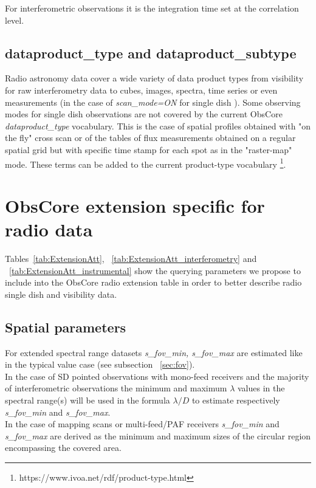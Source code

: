\documentclass[11pt,a4paper]{ivoa}
\begin{document}
For interferometric observations it is the integration time set at the correlation level.

\subsection{dataproduct\_type and dataproduct\_subtype}

Radio astronomy data cover a wide variety of data product types from visibility for raw interferometry data to cubes, images, spectra, time series
or even measurements (in the case of \emph{scan\_mode=ON}  for single dish ). 
Some observing modes for single dish observations are not covered by
the current ObsCore \emph{dataproduct\_type} vocabulary. 
This is the case of spatial profiles obtained with "on the fly" cross scan or of the
tables of flux measurements obtained on a regular spatial grid but with specific time stamp 
for each spot as in the "raster-map"  mode.
These terms can be added to the current product-type vocabulary \footnote{https://www.ivoa.net/rdf/product-type.html}.

\section{ObsCore extension specific for radio data}

Tables~\ref{tab:ExtensionAtt}, ~\ref{tab:ExtensionAtt_interferometry} and ~\ref{tab:ExtensionAtt_instrumental} show the
querying parameters we propose to include into the ObsCore radio extension table in order to better describe radio single dish and visibility data.

\subsection{Spatial parameters}

For extended spectral range datasets \emph{s\_fov\_min, s\_fov\_max} are estimated like in the typical value case (see subsection ~\ref{sec:fov}).\\
In the case of SD pointed observations with mono-feed receivers and the majority of interferometric observations the minimum and maximum
$\lambda$ values in the spectral range(s) will be used in the formula  $\lambda / D$ to estimate respectively \emph{s\_fov\_min} and  \emph{s\_fov\_max}. \\
In the case of mapping scans or multi-feed/PAF receivers \emph{ s\_fov\_min} and \emph{s\_fov\_max} are derived as the minimum and maximum sizes of the
circular region encompassing the covered area.
\end{document}
